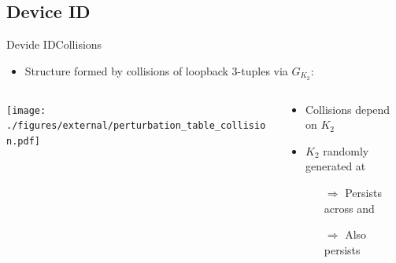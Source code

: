 \documentclass[aspectratio=169, hyperref={colorlinks=true, allcolors=SecondaryColor}, c]{beamer}
\begin{document}
	\subsection{Device ID}

	\begin{frame}[fragile]{Devide ID}{Collisions}
		\begin{itemize}
			\item Structure formed by \alert{collisions of loopback 3-tuples} via $G_{K_2}$:
		\end{itemize}
		\begin{columns}
			\begin{column}{0.6\textwidth}
				\vspace{0.5cm}
				\texttt{[image: ./figures/external/perturbation\_table\_collision.pdf]} %
			\end{column}
			\begin{column}{0.4\textwidth}
				\begin{itemize}
					\item Collisions depend on $K_2$
					\item $K_2$ randomly generated at 
					\begin{itemize}
						\item[\alert{$\Rightarrow$}] Persists across  and 
						\item[\alert{$\Rightarrow$}] Also  persists
					\end{itemize}
				\end{itemize}


\end{column}
\end{columns}
\end{frame}
\end{document}
